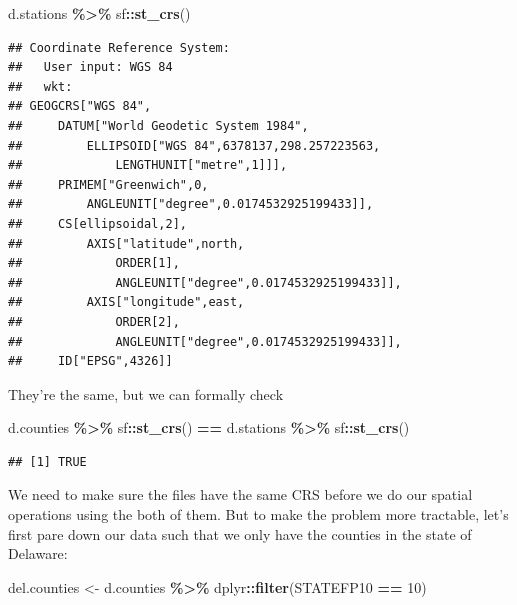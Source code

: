 \documentclass[]{article}
\newenvironment{Shaded}{\begin{snugshade}}{\end{snugshade}}
\newcommand{\DecValTok}[1]{\textcolor[rgb]{0.00,0.00,0.81}{#1}}
\newcommand{\FunctionTok}[1]{\textcolor[rgb]{0.13,0.29,0.53}{\textbf{#1}}}
\newcommand{\NormalTok}[1]{#1}
\newcommand{\OtherTok}[1]{\textcolor[rgb]{0.56,0.35,0.01}{#1}}
\newcommand{\SpecialCharTok}[1]{\textcolor[rgb]{0.81,0.36,0.00}{\textbf{#1}}}
\begin{document}
\begin{Shaded}
\begin{Highlighting}[]
\NormalTok{d.stations }\SpecialCharTok{\%\textgreater{}\%}\NormalTok{ sf}\SpecialCharTok{::}\FunctionTok{st\_crs}\NormalTok{()}
\end{Highlighting}
\end{Shaded}

\begin{verbatim}
## Coordinate Reference System:
##   User input: WGS 84 
##   wkt:
## GEOGCRS["WGS 84",
##     DATUM["World Geodetic System 1984",
##         ELLIPSOID["WGS 84",6378137,298.257223563,
##             LENGTHUNIT["metre",1]]],
##     PRIMEM["Greenwich",0,
##         ANGLEUNIT["degree",0.0174532925199433]],
##     CS[ellipsoidal,2],
##         AXIS["latitude",north,
##             ORDER[1],
##             ANGLEUNIT["degree",0.0174532925199433]],
##         AXIS["longitude",east,
##             ORDER[2],
##             ANGLEUNIT["degree",0.0174532925199433]],
##     ID["EPSG",4326]]
\end{verbatim}

They're the same, but we can formally check

\begin{Shaded}
\begin{Highlighting}[]
\NormalTok{d.counties }\SpecialCharTok{\%\textgreater{}\%}\NormalTok{ sf}\SpecialCharTok{::}\FunctionTok{st\_crs}\NormalTok{() }\SpecialCharTok{==}\NormalTok{ d.stations }\SpecialCharTok{\%\textgreater{}\%}\NormalTok{ sf}\SpecialCharTok{::}\FunctionTok{st\_crs}\NormalTok{()}
\end{Highlighting}
\end{Shaded}

\begin{verbatim}
## [1] TRUE
\end{verbatim}

We need to make sure the files have the same CRS before we do our
spatial operations using the both of them. But to make the problem more
tractable, let's first pare down our data such that we only have the
counties in the state of Delaware:

\begin{Shaded}
\begin{Highlighting}[]
\NormalTok{del.counties }\OtherTok{\textless{}{-}}\NormalTok{ d.counties }\SpecialCharTok{\%\textgreater{}\%}\NormalTok{ dplyr}\SpecialCharTok{::}\FunctionTok{filter}\NormalTok{(STATEFP10 }\SpecialCharTok{==} \DecValTok{10}\NormalTok{)}
\end{Highlighting}
\end{Shaded}
\end{document}
